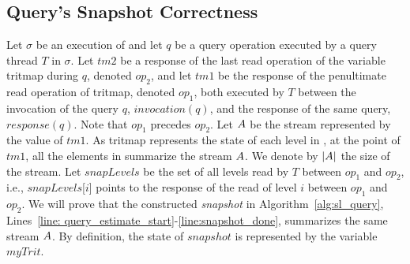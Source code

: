 
\subsection{Query's Snapshot Correctness} \label{ssec:query_proof}
Let $\sigma$ be an execution of \mysketch and let $q$ be a query operation executed by a query thread $T$ in $\sigma$. 
Let $tm2$ be a response of the last read operation of the variable tritmap during $q$, denoted $op_2$, and let $tm1$ be the response of the penultimate read operation of tritmap, denoted $op_1$, both executed by $T$ between the invocation of the query $q$, $invocation(q)$, and the response of the same query, $response(q)$. Note that $op_1$ precedes $op_2$. 
Let $\mathnormal{A}$ be the stream represented by the value of $tm1$. As tritmap represents the state of each level in \mysketch, at the point of $tm1$, all the elements in \mysketch summarize the stream $\mathnormal{A}$. We denote by $|\mathnormal{A}|$ the size of the stream.
Let $\mathit{snapLevels}$ be the set of all levels read by $T$ between $op_1$ and $op_2$, i.e., $\mathit{snapLevels}$[$i$] points to the response of the read of level $i$ between $op_1$ and $op_2$.
We will prove that the constructed \emph{snapshot} in Algorithm~\ref{alg:sl_query}, Lines~\ref{line: query_estimate_start}-\ref{line:snapshot_done}, summarizes the same stream $\mathnormal{A}$.
By definition, the state of $snapshot$ is represented by the variable $myTrit$.

